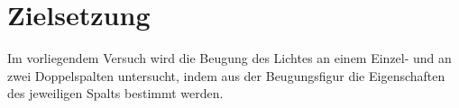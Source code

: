 
\section{Zielsetzung}
\label{sec:Zielsetzung}

Im vorliegendem Versuch wird die Beugung des Lichtes an einem Einzel- und an zwei Doppelspalten untersucht, indem aus der Beugungsfigur die Eigenschaften des jeweiligen Spalts bestimmt werden. 